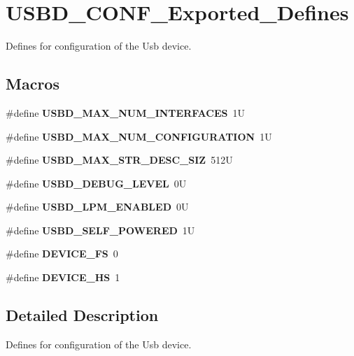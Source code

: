 \hypertarget{group__USBD__CONF__Exported__Defines}{}\section{U\+S\+B\+D\+\_\+\+C\+O\+N\+F\+\_\+\+Exported\+\_\+\+Defines}
\label{group__USBD__CONF__Exported__Defines}


Defines for configuration of the Usb device.  


\subsection*{Macros}
\begin{DoxyCompactItemize}
\item 
\mbox{\label{group__USBD__CONF__Exported__Defines_ga121d6d45e8011e1f372a365986126d0e}} 
\#define {\bfseries U\+S\+B\+D\+\_\+\+M\+A\+X\+\_\+\+N\+U\+M\+\_\+\+I\+N\+T\+E\+R\+F\+A\+C\+ES}~1U
\item 
\mbox{\label{group__USBD__CONF__Exported__Defines_gaef1f76fda5677f5ad43c25a2ba4ebcde}} 
\#define {\bfseries U\+S\+B\+D\+\_\+\+M\+A\+X\+\_\+\+N\+U\+M\+\_\+\+C\+O\+N\+F\+I\+G\+U\+R\+A\+T\+I\+ON}~1U
\item 
\mbox{\label{group__USBD__CONF__Exported__Defines_ga056ff3fee04cffde6a1ccccd566f8682}} 
\#define {\bfseries U\+S\+B\+D\+\_\+\+M\+A\+X\+\_\+\+S\+T\+R\+\_\+\+D\+E\+S\+C\+\_\+\+S\+IZ}~512U
\item 
\mbox{\label{group__USBD__CONF__Exported__Defines_gae7364a789408417d945d5ca96679ccf7}} 
\#define {\bfseries U\+S\+B\+D\+\_\+\+D\+E\+B\+U\+G\+\_\+\+L\+E\+V\+EL}~0U
\item 
\mbox{\label{group__USBD__CONF__Exported__Defines_ga61c094d920ba8d41bd826e6d51a3d80e}} 
\#define {\bfseries U\+S\+B\+D\+\_\+\+L\+P\+M\+\_\+\+E\+N\+A\+B\+L\+ED}~0U
\item 
\mbox{\label{group__USBD__CONF__Exported__Defines_ga07065dc40f090f051dd1dd6d5901930a}} 
\#define {\bfseries U\+S\+B\+D\+\_\+\+S\+E\+L\+F\+\_\+\+P\+O\+W\+E\+R\+ED}~1U
\item 
\mbox{\label{group__USBD__CONF__Exported__Defines_ga609db9b232fa154e9b1c86bcdd17e97c}} 
\#define {\bfseries D\+E\+V\+I\+C\+E\+\_\+\+FS}~0
\item 
\mbox{\label{group__USBD__CONF__Exported__Defines_ga4743bb97c140c3615b999a81a0301815}} 
\#define {\bfseries D\+E\+V\+I\+C\+E\+\_\+\+HS}~1
\end{DoxyCompactItemize}


\subsection{Detailed Description}
Defines for configuration of the Usb device. 

